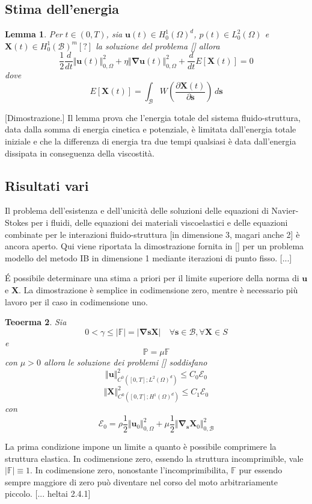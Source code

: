 \documentclass{book}
\newtheorem{theorem}{Teoerma}[section]
\newtheorem{lemma}[theorem]{Lemma}
\newcommand{\Nabla}{\boldsymbol{\nabla}}
\begin{document}
\subsection{Stima dell'energia}
\begin{lemma}
Per $t \in (0,T)$, sia $\mathbf{u}(t)\in H^1_0(\Omega)^d$, $p(t)\in L^2_0(\Omega)$ e $\mathbf{X}(t)\in H^1_0(\mathcal{B})^m [?]$ la soluzione del problema [] allora $$\frac{1}{2}\frac{d}{dt}\Vert\mathbf{u}(t)\Vert^2_{0,\Omega}+\eta\Vert\Nabla\mathbf{u}(t)\Vert^2_{0,\Omega}+\frac{d}{dt}E[\mathbf{X}(t)]=0$$
dove 
$$E[\mathbf{X}(t)]=\int_\mathcal{B}W\left (\frac{\partial \mathbf{X}(t)}{\partial \mathbf{s}}\right )\, d\mathbf{s}$$
\end{lemma}
[Dimostrazione.]
Il lemma prova che l'energia totale del sistema fluido-struttura, data dalla somma di energia cinetica e potenziale, è limitata dall'energia totale iniziale e che la differenza di energia tra due tempi qualsiasi è data dall'energia dissipata in conseguenza della viscostità.

\subsection{Risultati vari}
Il problema dell'esistenza e dell'unicità delle soluzioni delle equazioni di Navier-Stokes per i fluidi, delle equazioni dei materiali viscoelastici e delle equazioni combinate per le interazioni fluido-struttura [in dimensione 3, magari anche 2] è ancora aperto. Qui viene riportata la dimostrazione fornita in  [] per un problema modello del metodo IB in dimensione 1 mediante iterazioni di punto fisso. [...]

\'E possibile determinare una stima a priori per il limite superiore della norma di $\mathbf{u}$ e $\mathbf{X}$. La dimostrazione è semplice in codimensione zero, mentre è necessario più lavoro per il caso in codimensione uno.

\begin{theorem}
Sia 
\begin{equation}
0<\gamma\leq\vert\mathbb{F}\vert=\vert\Nabla\mathbf{s}\mathbf{X}\vert\quad\forall\mathbf{s}\in\mathcal{B},\forall\mathbf{X}\in S
\end{equation}
e 
\begin{equation}
\mathbb{P}=\mu\mathbb{F}
\end{equation}
 con $\mu>0$ allora le soluzione dei problemi [] soddisfano
$$\Vert\mathbf{u}\Vert^2_{C^0([0,T];L^2(\Omega)^d)}\leq C_0\mathcal{E}_0$$
$$\Vert\mathbf{X}\Vert^2_{C^0([0,T];H^1(\Omega)^d)}\leq C_1\mathcal{E}_0$$
con
$$\mathcal{E}_0=\rho\frac{1}{2}\Vert\mathbf{u}_0\Vert^2_{0,\Omega}+\mu\frac{1}{2}\Vert\Nabla_\mathbf{s}\mathbf{X}_0\Vert^2_{0,\mathcal{B}}$$
\end{theorem}
La prima condizione impone un limite a quanto è possibile comprimere la struttura elastica. In codimensione zero, essendo la struttura incomprimible, vale $|\mathbb{F}|\equiv1$. In codimensione zero, nonostante l'incomprimibilita, $\mathbb{F}$ pur essendo sempre maggiore di zero può diventare nel corso del moto arbitrariamente piccolo.
[... heltai 2.4.1]
\end{document}
